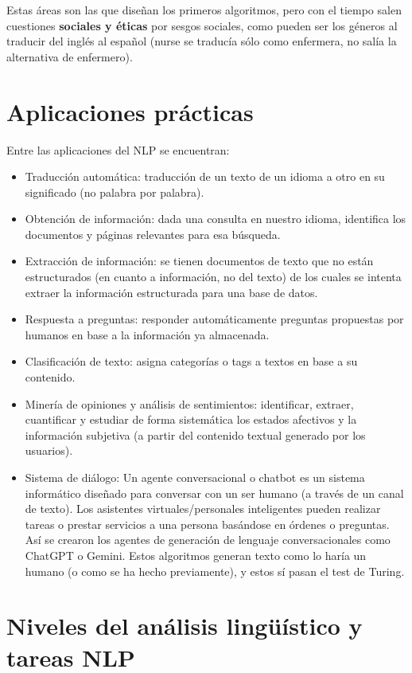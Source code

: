 Estas áreas son las que diseñan los primeros algoritmos, pero con el tiempo salen cuestiones \textbf{sociales y éticas} por sesgos sociales, como pueden ser los géneros al traducir del inglés al español (nurse se traducía sólo como enfermera, no salía la alternativa de enfermero).

\section{Aplicaciones prácticas}
Entre las aplicaciones del NLP se encuentran:
\begin{itemize}
\item Traducción automática: traducción de un texto de un idioma a otro en su significado (no palabra por palabra).
\item Obtención de información: dada una consulta en nuestro idioma, identifica los documentos y páginas relevantes para esa búsqueda. 
\item Extracción de información: se tienen documentos de texto que no están estructurados (en cuanto a información, no del texto) de los cuales se intenta extraer la información estructurada para una base de datos.
\item Respuesta a preguntas: responder automáticamente preguntas propuestas por humanos en base a la información ya almacenada.
\item Clasificación de texto: asigna categorías o tags a textos en base a su contenido.
\item Minería de opiniones y análisis de sentimientos: identificar, extraer, cuantificar y estudiar de forma sistemática los estados afectivos y la información subjetiva (a partir del contenido textual generado por los usuarios).
\item Sistema de diálogo: Un agente conversacional o chatbot es un sistema informático diseñado para conversar con un ser humano (a través de un canal de texto). Los asistentes virtuales/personales inteligentes pueden realizar tareas o prestar servicios a una persona basándose en órdenes o preguntas. Así se crearon los agentes de generación de lenguaje conversacionales como ChatGPT o Gemini. Estos algoritmos generan texto como lo haría un humano (o como se ha hecho previamente), y estos sí pasan el test de Turing.
\end{itemize}

\section{Niveles del análisis lingüístico y tareas NLP}
